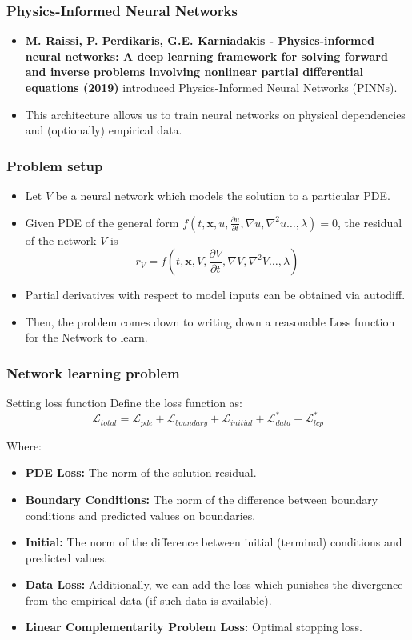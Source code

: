 \documentclass{beamer}
\begin{document}
\begin{frame}
\frametitle{Physics-Informed Neural Networks}
\begin{itemize}
    \item \textbf{M. Raissi, P. Perdikaris, G.E. Karniadakis - Physics-informed neural networks: A deep learning framework for solving forward and inverse problems involving nonlinear partial differential equations (2019)} introduced Physics-Informed Neural Networks (PINNs).
    \item This architecture allows us to train neural networks on physical dependencies and (optionally) empirical data.
\end{itemize}
\end{frame}

\begin{frame}
\frametitle{Problem setup}
\begin{itemize}
    \item Let $V$ be a neural network which models the solution to a particular PDE.
    \item Given PDE of the general form $f\left(t, \mathbf{x}, u, \frac{\partial u}{\partial t}, \nabla u, \nabla^2 u \ldots, \lambda\right) = 0$, the residual of the network $V$ is $$r_V = f\left(t, \mathbf{x}, V, \frac{\partial V}{\partial t}, \nabla V, \nabla^2 V \ldots, \lambda\right)$$
    \item Partial derivatives with respect to model inputs can be obtained via autodiff.
    \item Then, the problem comes down to writing down a reasonable Loss function for the Network to learn.
\end{itemize}
\end{frame}

\begin{frame}
\frametitle{Network learning problem}
\begin{block}{Setting loss function}
        Define the loss function as:
        $$\mathcal{L}_{total}=\mathcal{L}_{pde}+\mathcal{L}_{boundary}+\mathcal{L}_{initial} + \mathcal{L}_{data}^*+ \mathcal{L}_{lcp}^*$$

        Where:
        \begin{itemize}
            \item \textbf{PDE Loss:} The norm of the solution residual. 
            \item \textbf{Boundary Conditions:} The norm of the difference between boundary conditions and predicted values on boundaries.
            \item \textbf{Initial:} The norm of the difference between initial (terminal) conditions and predicted values.
            \item \textbf{Data Loss:} Additionally, we can add the loss which punishes the divergence from the empirical data (if such data is available).
            \item \textbf{Linear Complementarity Problem Loss:} Optimal stopping loss.
        \end{itemize}
    \end{block}
\end{frame}
\end{document}
